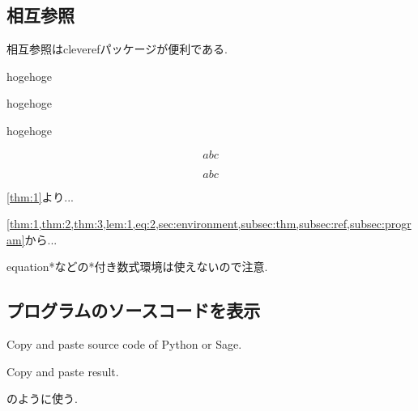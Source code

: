 \documentclass[11pt,a4paper,oneside,lualatex]{ltjsarticle} %
\numberwithin{equation}{section} %
\begin{document}

\subsection{相互参照} \label{subsec:ref}


相互参照はcleverefパッケージが便利である. 

\begin{thm} \label{thm:2}
	hogehoge
\end{thm}

\begin{thm} \label{thm:3}
	hogehoge
\end{thm}

\begin{lem} \label{lem:1}
	hogehoge
\end{lem}

\begin{equation} \label{eq:1}
	abc
\end{equation}

\begin{equation} \label{eq:2}
	abc
\end{equation}

\cref{thm:1}より... 

\cref{thm:1,thm:2,thm:3,lem:1,eq:2,sec:environment,subsec:thm,subsec:ref,subsec:program}から...

equation*などの*付き数式環境は使えないので注意.


\subsection{プログラムのソースコードを表示} \label{subsec:program}


\begin{Python}
Copy and paste source code of Python or Sage.
\end{Python}
\begin{result}
Copy and paste result.
\end{result}
のように使う.

\end{document}
